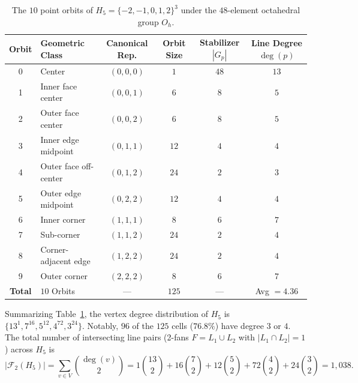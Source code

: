 \documentclass[11pt,a4paper]{article}
\theoremstyle{definition}
\theoremstyle{remark}
\begin{document}
\begin{table}[ht!]
\centering
\caption{The $10$ point orbits of $H_5 = \{-2,-1,0,1,2\}^3$ under the $48$-element octahedral group $O_h$.}
\label{tab:orbits}
\begin{tabular}{clcccc}
\toprule
\textbf{Orbit} & \textbf{Geometric Class} & \textbf{Canonical Rep.} & \textbf{Orbit Size} & \textbf{Stabilizer $|G_p|$} & \textbf{Line Degree $\deg(p)$} \\
\midrule
0 & Center                    & $(0,0,0)$ & $1$  & $48$ & $13$ \\
1 & Inner face center         & $(0,0,1)$ & $6$  & $8$  & $5$  \\
2 & Outer face center         & $(0,0,2)$ & $6$  & $8$  & $5$  \\
3 & Inner edge midpoint       & $(0,1,1)$ & $12$ & $4$  & $4$  \\
4 & Outer face off-center     & $(0,1,2)$ & $24$ & $2$  & $3$  \\
5 & Outer edge midpoint       & $(0,2,2)$ & $12$ & $4$  & $4$  \\
6 & Inner corner              & $(1,1,1)$ & $8$  & $6$  & $7$  \\
7 & Sub-corner                & $(1,1,2)$ & $24$ & $2$  & $4$  \\
8 & Corner-adjacent edge      & $(1,2,2)$ & $24$ & $2$  & $4$  \\
9 & Outer corner              & $(2,2,2)$ & $8$  & $6$  & $7$  \\
\midrule
\textbf{Total} & $10$ Orbits & --- & $125$ & --- & Avg $= 4.36$ \\
\bottomrule
\end{tabular}
\end{table}

Summarizing Table~\ref{tab:orbits}, the vertex degree distribution of $H_5$ is $\{13^1, 7^{16}, 5^{12}, 4^{72}, 3^{24}\}$. Notably, $96$ of the $125$ cells ($76.8\%$) have degree $3$ or $4$. The total number of intersecting line pairs (2-fans $F = L_1 \cup L_2$ with $|L_1 \cap L_2| = 1$) across $H_5$ is
\begin{equation}
    |\mathcal{F}_2(H_5)| = \sum_{v \in V} \binom{\deg(v)}{2} = 1\binom{13}{2} + 16\binom{7}{2} + 12\binom{5}{2} + 72\binom{4}{2} + 24\binom{3}{2} = 1,038.
\end{equation}
\end{document}
